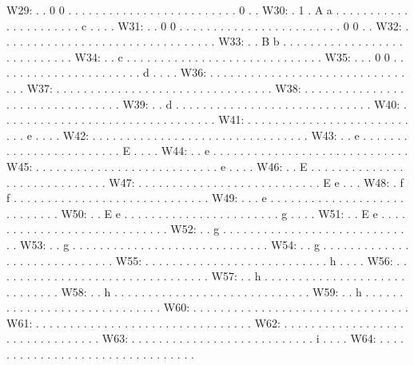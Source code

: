 \begingroup
\fontsize{8pt}{9pt}\selectfont
\begin{verbbox}
W29:	 . . 0 0 . . . . . . . . . . . . . . . . . . . . . . . . . 0 . .
W30:	 . 1 . A a . . . . . . . . . . . . . . . . . . . . . . c . . . .
W31:	 . . 0 0 . . . . . . . . . . . . . . . . . . . . . . . . 0 0 . .
W32:	 . . . . . . . . . . . . . . . . . . . . . . . . . . . . . . . .
W33:	 . . B b . . . . . . . . . . . . . . . . . . . . . . . . . . . .
W34:	 . . c . . . . . . . . . . . . . . . . . . . . . . . . . . . . .
W35:	 . . . 0 0 . . . . . . . . . . . . . . . . . . . . . . d . . . .
W36:	 . . . . . . . . . . . . . . . . . . . . . . . . . . . . . . . .
W37:	 . . . . . . . . . . . . . . . . . . . . . . . . . . . . . . . .
W38:	 . . . . . . . . . . . . . . . . . . . . . . . . . . . . . . . .
W39:	 . . d . . . . . . . . . . . . . . . . . . . . . . . . . . . . .
W40:	 . . . . . . . . . . . . . . . . . . . . . . . . . . . . . . . .
W41:	 . . . . . . . . . . . . . . . . . . . . . . . . . . . e . . . .
W42:	 . . . . . . . . . . . . . . . . . . . . . . . . . . . . . . . .
W43:	 . . e . . . . . . . . . . . . . . . . . . . . . . . . E . . . .
W44:	 . . e . . . . . . . . . . . . . . . . . . . . . . . . . . . . .
W45:	 . . . . . . . . . . . . . . . . . . . . . . . . . . . e . . . .
W46:	 . . E . . . . . . . . . . . . . . . . . . . . . . . . . . . . .
W47:	 . . . . . . . . . . . . . . . . . . . . . . . . . . . E e . . .
W48:	 . f f . . . . . . . . . . . . . . . . . . . . . . . . . . . . .
W49:	 . . . e . . . . . . . . . . . . . . . . . . . . . . . . . . . .
W50:	 . . E e . . . . . . . . . . . . . . . . . . . . . . . g . . . .
W51:	 . . E e . . . . . . . . . . . . . . . . . . . . . . . . . . . .
W52:	 . . g . . . . . . . . . . . . . . . . . . . . . . . . . . . . .
W53:	 . . g . . . . . . . . . . . . . . . . . . . . . . . . . . . . .
W54:	 . . g . . . . . . . . . . . . . . . . . . . . . . . . . . . . .
W55:	 . . . . . . . . . . . . . . . . . . . . . . . . . . . h . . . .
W56:	 . . . . . . . . . . . . . . . . . . . . . . . . . . . . . . . .
W57:	 . . h . . . . . . . . . . . . . . . . . . . . . . . . . . . . .
W58:	 . . h . . . . . . . . . . . . . . . . . . . . . . . . . . . . .
W59:	 . . h . . . . . . . . . . . . . . . . . . . . . . . . . . . . .
W60:	 . . . . . . . . . . . . . . . . . . . . . . . . . . . . . . . .
W61:	 . . . . . . . . . . . . . . . . . . . . . . . . . . . . . . . .
W62:	 . . . . . . . . . . . . . . . . . . . . . . . . . . . . . . . .
W63:	 . . . . . . . . . . . . . . . . . . . . . . . . . . . i . . . .
W64:	 . . . . . . . . . . . . . . . . . . . . . . . . . . . . . . . .

\end{verbbox}
